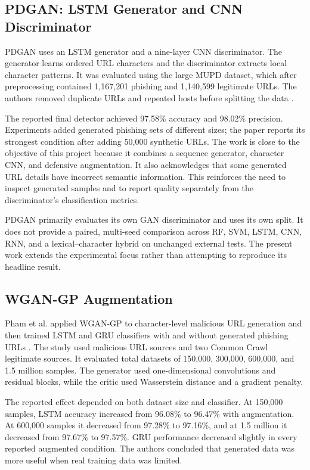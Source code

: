 \subsection{PDGAN: LSTM Generator and CNN Discriminator}

PDGAN uses an LSTM generator and a nine-layer CNN discriminator. The generator
learns ordered URL characters and the discriminator extracts local character
patterns. It was evaluated using the large MUPD dataset, which after
preprocessing contained 1,167,201 phishing and 1,140,599 legitimate URLs. The
authors removed duplicate URLs and repeated hosts before splitting the data
\citep{alahmadi2022pdgan}.

The reported final detector achieved 97.58\% accuracy and 98.02\% precision.
Experiments added generated phishing sets of different sizes; the paper reports
its strongest condition after adding 50,000 synthetic URLs. The work is close
to the objective of this project because it combines a sequence generator,
character CNN, and defensive augmentation. It also acknowledges that some
generated URL details have incorrect semantic information. This reinforces the
need to inspect generated samples and to report quality separately from the
discriminator's classification metrics.

PDGAN primarily evaluates its own GAN discriminator and uses its own split.
It does not provide a paired, multi-seed comparison across RF, SVM, LSTM, CNN,
RNN, and a lexical--character hybrid on unchanged external tests. The present
work extends the experimental focus rather than attempting to reproduce its
headline result.

\subsection{WGAN-GP Augmentation}

Pham et al. applied WGAN-GP to character-level malicious URL generation and
then trained LSTM and GRU classifiers with and without generated phishing URLs
\citep{pham2021generated}. The study used malicious URL sources and two Common
Crawl legitimate sources. It evaluated total datasets of 150,000, 300,000,
600,000, and 1.5 million samples. The generator used one-dimensional
convolutions and residual blocks, while the critic used Wasserstein distance
and a gradient penalty.

The reported effect depended on both dataset size and classifier. At 150,000
samples, LSTM accuracy increased from 96.08\% to 96.47\% with augmentation. At
600,000 samples it decreased from 97.28\% to 97.16\%, and at 1.5 million it
decreased from 97.67\% to 97.57\%. GRU performance decreased slightly in every
reported augmented condition. The authors concluded that generated data was
more useful when real training data was limited.

